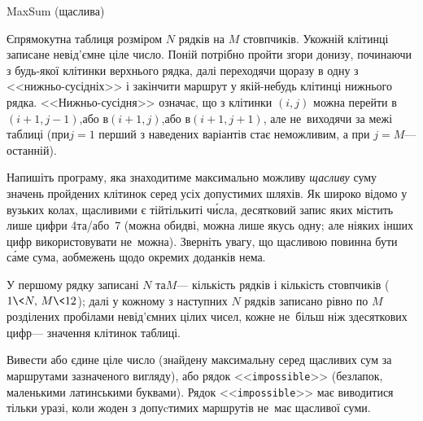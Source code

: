 \begin{problemAllDefault}{MaxSum (щаслива)}

Є\nolinebreak[3] прямокутна таблиця розміром $N$ рядків на $M$ стовпчиків. У\nolinebreak[3] кожній клітинці записане невід'ємне ціле число. 
По\nolinebreak[3] ній потрібно пройти згори донизу, починаючи з будь-якої клітинки верхнього рядка, 
далі переходячи щоразу в одну з <<нижньо-сусідніх>> і закінчити маршрут у якій-небудь клітинці нижнього рядка. 
<<Нижньо-сусідня>> означає, що з клітинки $(i,j)$ можна
перейти в\nolinebreak[2] ${(i+1, j-1)}$,\linebreak[2] 
або в\nolinebreak[2] ${(i+1,j)}$,\linebreak[2]
або в\nolinebreak[2] ${(i+1,j+1)}$, 
але не~виходячи за межі таблиці (при\nolinebreak[2] ${j=1}$ перший з наведених варіантів стає неможливим, а при ${j=M}$\nolinebreak[3] --- останній).

Напишіть програму, яка знаходитиме максимально можливу \emph{щасливу} суму значень пройдених клітинок 
серед усіх допустимих шляхів.
Як широко відомо у вузьких колах, щасливими є ті\nolinebreak[2] й\nolinebreak[2] тільки\nolinebreak[2] ті ч\'{и}сла, десятковий запис яких містить лише цифри 4\nolinebreak[3] \mbox{та/або}~7 
(можна обидві, можна лише якусь одну; але ніяких інших цифр використовувати не~можна).
Зверніть увагу, що щасливою повинна бути с\'{а}ме сума, а\nolinebreak[3] обмежень щодо окремих доданків нема.

\InputFile
У першому рядку записані $N$ та\nolinebreak[3] $M$\nolinebreak[3] --- кількість рядків і кількість стовпчиків 
(${1\<N,\,M\<12}$); далі у кожному з наступних $N$ рядків 
записано рівно по $M$ розділених пробілами невід'ємних цілих чисел, 
кожне не~більш ніж з\nolinebreak[3] десяткових цифр\nolinebreak[3] --- значення клітинок таблиці.

\OutputFile
Вивести або єдине ціле число (знайдену максимальну серед щасливих сум за маршрутами зазначеного вигляду), 
або рядок <<\texttt{impossible}>> (без\nolinebreak[2] лапок, маленькими латинськими буквами). 
Рядок <<\texttt{impossible}>> має виводитися тільки у\nolinebreak[2] разі, коли жоден з допуcтимих маршрутів не~має щасливої суми.



\end{problemAllDefault}

